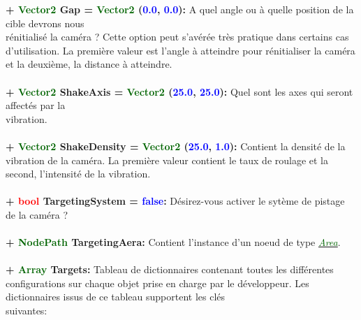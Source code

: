 \documentclass[a4paper, 11pt]{article}
\begin{document}
	\textbf{+ \textcolor{darkgreen}{Vector2} \hypertarget{gap}{Gap} = \textcolor{darkgreen}{Vector2} 
	(\textcolor{blue}{0.0}, \textcolor{blue}{0.0}):} A quel angle ou à quelle position de la cible devrons 
	nous \\rénitialisé la caméra ? Cette option peut s'avérée très pratique dans certains cas d'utilisation. 
	La première valeur est l'angle à atteindre pour rénitialiser la caméra et la deuxième, la distance à 
	atteindre.\\\\
	\textbf{+ \textcolor{darkgreen}{Vector2} \hypertarget{shkaxis}{ShakeAxis} = \textcolor{darkgreen}
	{Vector2} (\textcolor{blue}{25.0}, \textcolor{blue}{25.0}):} Quel sont les axes qui seront affectés par 
	la \\vibration.\\\\
	\textbf{+ \textcolor{darkgreen}{Vector2} \hypertarget{shkden}{ShakeDensity} = \textcolor{darkgreen}
	{Vector2} (\textcolor{blue}{25.0}, \textcolor{blue}{1.0}):} Contient la densité de la vibration de la 
	caméra. La première valeur contient le taux de roulage et la second, l'intensité de la vibration.\\\\	
	\textbf{+ \textcolor{red}{bool} TargetingSystem = \textcolor{blue}{false}:} Désirez-vous activer le 
	sytème de pistage de la caméra ?\\\\
	\textbf{+ \textcolor{darkgreen}{NodePath} TargetingAera:} Contient l'instance d'un noeud de type 
	\href{https://docs.godotengine.org/en/stable/classes/class_area.html}
	{\textit{\textcolor{darkgreen}{Area}}}.\\\\
	\textbf{+ \textcolor{darkgreen}{Array} Targets:} Tableau de dictionnaires contenant toutes les 
	différentes configurations sur chaque objet prise en charge par le développeur. Les dictionnaires issus 
	de ce tableau supportent les clés \\suivantes:\\
\end{document}
